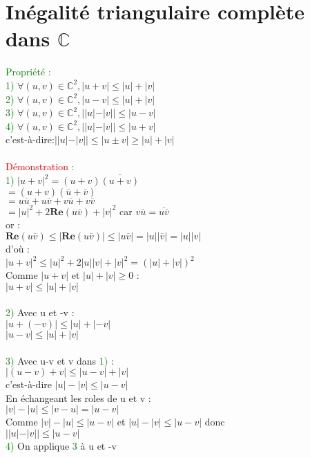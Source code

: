 \documentclass{article}
\begin{document}
\section{Inégalité triangulaire complète dans $\mathbb{C}$}
\textcolor{green}{Propriété : } \\
\indent \textcolor{green}{1) }$\forall(u,v)\in \mathbb{C}^2, |u+v| \leq |u|+|v|$ \\
\indent \textcolor{green}{2) }$\forall(u,v)\in \mathbb{C}^2, |u-v| \leq |u|+|v|$ \\
\indent \textcolor{green}{3) }$\forall(u,v)\in \mathbb{C}^2, ||u|-|v|| \leq |u-v|$ \\
\indent \textcolor{green}{4) }$\forall(u,v)\in \mathbb{C}^2, ||u|-|v|| \leq |u+v|$ \\
c'est-à-dire:$||u|-|v|| \leq |u \pm v | \geq |u|+|v|$ \\ \\
\textcolor{red}{Démonstration :} \\
\textcolor{green}{1) } $|u+v|^2=(u+v)\overline{(u+v)}$ \\
\indent $=(u+v)(\overline{u}+\overline{v})$ \\
\indent $=u\overline{u}+u\overline{v}+v\overline{u}+v\overline{v}$ \\
\indent $= |u|^2+2\mathbf{Re}(u\overline{v})+|v|^2$ car $v\overline{u}=\overline{u\overline{v}}$ \\
or : \\
$ \mathbf{Re} (u\overline{v}) \leq | \mathbf{Re}(u\overline{v})| \leq |u \overline{v} |=| u|| \overline{v} |=|u| |v|$ \\
d'où : \\
$|u+v|^2 \leq |u|^2 +2|u||v|+|v|^2=(|u|+|v|)^2$ \\
Comme $|u+v|$ et $|u|+|v|\geq 0$ : \\
\indent $|u+v| \leq |u|+|v|$ \\ \\
\textcolor{green}{2) } Avec u et -v : \\
$|u+(-v)| \leq |u|+|-v|$ \\
$|u-v| \leq |u| +|v|$ \\ \\
\textcolor{green}{3) }Avec u-v et v dans \textcolor{green}{1) } : \\
\indent $|(u-v)+v| \leq |u-v|+|v|$ \\
c'est-à-dire $|u| -|v| \leq |u-v|$ \\
En échangeant les roles de u et v : \\
$|v|-|u|\leq |v-u|=|u-v|$ \\
Comme $|v|-|u| \leq |u-v|$ et $|u|-|v| \leq |u-v|$ donc \\
\indent $||u|-|v|| \leq |u-v|$ \\
\textcolor{green}{4) } On applique \textcolor{green}{3} à u et -v 
\end{document}
